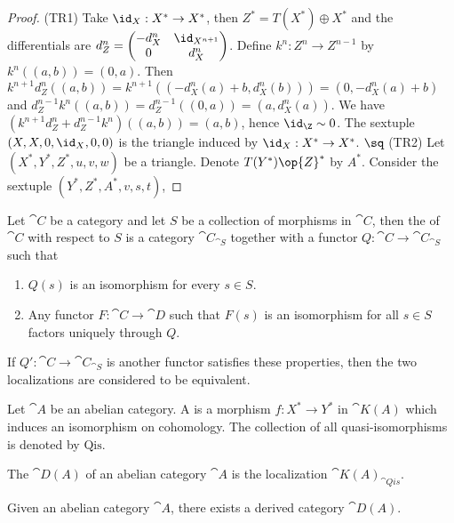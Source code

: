 \begin{proof}
    (TR1) Take ${\id}_{X}:{X}^{*}\to{X}^{*}$, then ${Z}^{*}=T({X}^{*})\oplus{X}^{*}$ and the differentials are ${d}_{Z}^{n}=\begin{pmatrix}
        -{d}_{X}^{n} & {\id}_{{X}^{n+1}} \\
        0 & {d}_{X}^{n}
    \end{pmatrix}$. Define ${k}^{n}:{Z}^{n}\to{Z}^{n-1}$ by ${k}^{n}((a,b))=(0,a)$. Then ${k}^{n+1}{d}_{Z}^{n}((a,b))={k}^{n+1}((-{d}_{X}^{n}(a)+b,{d}_{X}^{n}(b)))=(0,-{d}_{X}^{n}(a)+b)$ and ${d}_{Z}^{n-1}{k}^{n}((a,b))={d}_{Z}^{n-1}((0,a))=(a,{d}_{X}^{n}(a))$. We have $({k}^{n+1}{d}_{Z}^{n}+{d}_{Z}^{n-1}{k}^{n})((a,b))=(a,b)$, hence ${\id}_{\Z}\sim 0$. The sextuple $(X,X,0,{\id}_{X},0,0)$ is the triangle induced by ${\id}_{X}:{X}^{*}\to{X}^{*}$. $\sq$ (TR2) Let $({X}^{*},{Y}^{*},{Z}^{*},u,v,w)$ be a triangle. Denote $T({Y}^{*})\op{Z}^{*}$ by ${A}^{*}$. Consider the sextuple $({Y}^{*},{Z}^{*},{A}^{*},v,s,t)$, 
\end{proof}
\begin{definition}
    Let $\cat{C}$ be a category and let $S$ be a collection of morphisms in $\cat{C}$, then the  of $\cat{C}$ with respect to $S$ is a category ${\cat{C}}_{\cat{S}}$ together with a functor $Q:\cat{C}\to{\cat{C}}_{\cat{S}}$ such that 
    \begin{enumerate}
        \item $Q(s)$ is an isomorphism for every $s\in S$.
        \item Any functor $F:\cat{C}\to\cat{D}$ such that $F(s)$ is an isomorphism for all $s\in S$ factors uniquely through $Q$.
    \end{enumerate}
    If $Q':\cat{C}\to{\cat{C}}_{\cat{S}}$ is another functor satisfies these properties, then the two localizations are considered to be equivalent. 
\end{definition}
\begin{definition}
    Let $\cat{A}$ be an abelian category. A  is a morphism $f:{X}^{*}\to{Y}^{*}$ in $\cat{K(A)}$ which induces an isomorphism on cohomology. The collection of all quasi-isomorphisms is denoted by $\text{Qis}$.
\end{definition}
\begin{definition}
    The  $\cat{D(A)}$ of an abelian category $\cat{A}$ is the localization ${\cat{K(A)}}_{\cat{Qis}}$.
\end{definition}
\begin{proposition}
    Given an abelian category $\cat{A}$, there exists a derived category $\cat{D(A)}$. 
\end{proposition}
